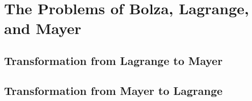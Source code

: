 \section{The Problems of Bolza, Lagrange, and Mayer}

\subsection{Transformation from Lagrange to Mayer}

\subsection{Transformation from Mayer to Lagrange}
